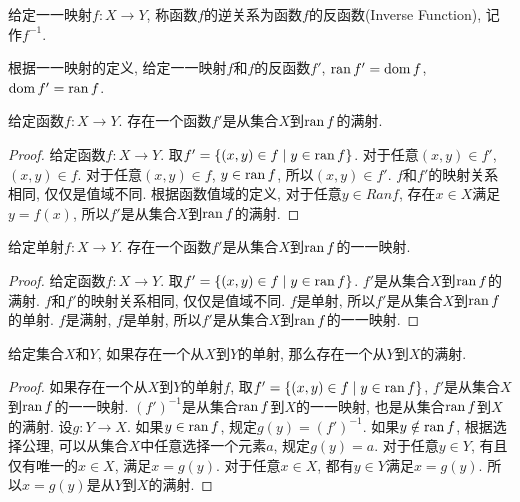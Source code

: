 \begin{definition}
	给定一一映射$f\colon X\rightarrow Y$, 称函数$f$的逆关系为函数$f$的反函数(Inverse Function), 记作$f^{-1}$. 
\end{definition}

根据一一映射的定义, 给定一一映射$f$和$f$的反函数$f'$, $\operatorname{ran} f'=\operatorname{dom} f$, $\operatorname{dom} f'=\operatorname{ran} f$.

\begin{proposition}
	给定函数$f\colon X\rightarrow Y$. 存在一个函数$f'$是从集合$X$到$\operatorname{ran} f$的满射.
\end{proposition}

\begin{proof}
	给定函数$f\colon X\rightarrow Y$. 取$f'=\{(x,y)\in f\mid y\in \operatorname{ran} f\}$. 对于任意$(x,y)\in f'$, $(x,y)\in f$. 对于任意$(x,y)\in f$, $y\in \operatorname{ran} f$, 所以$(x,y)\in f'$. $f$和$f'$的映射关系相同, 仅仅是值域不同. 根据函数值域的定义, 对于任意$y\in Ran f$, 存在$x\in X$满足$y=f(x)$, 所以$f'$是从集合$X$到$\operatorname{ran} f$的满射.
\end{proof}

\begin{proposition}
	给定单射$f\colon X\rightarrow Y$. 存在一个函数$f'$是从集合$X$到$\operatorname{ran} f$的一一映射.
\end{proposition}

\begin{proof}
	给定函数$f\colon X\rightarrow Y$. 取$f'=\{(x,y)\in f\mid y\in \operatorname{ran} f\}$. $f'$是从集合$X$到$\operatorname{ran} f$的满射. $f$和$f'$的映射关系相同, 仅仅是值域不同. $f$是单射, 所以$f'$是从集合$X$到$\operatorname{ran} f$的单射.  $f$是满射, $f$是单射, 所以$f'$是从集合$X$到$\operatorname{ran} f$的一一映射.
\end{proof}

\begin{proposition}
	给定集合$X$和$Y$, 如果存在一个从$X$到$Y$的单射, 那么存在一个从$Y$到$X$的满射.
\end{proposition}

\begin{proof}
	如果存在一个从$X$到$Y$的单射$f$, 取$f'=\{(x,y)\in f\mid y\in \operatorname{ran} f\}$, $f'$是从集合$X$到$\operatorname{ran} f$的一一映射. $(f')^{-1}$是从集合$\operatorname{ran} f$到$X$的一一映射, 也是从集合$\operatorname{ran} f$到$X$的满射. 设$g\colon Y\rightarrow X$. 如果$y \in \operatorname{ran} f$, 规定$g(y)=(f')^{-1}$. 如果$y\notin \operatorname{ran} f$, 根据选择公理, 可以从集合$X$中任意选择一个元素$a$, 规定$g(y)=a$. 对于任意$y\in Y$, 有且仅有唯一的$x\in X$, 满足$x=g(y)$. 对于任意$x\in X$, 都有$y\in Y$满足$x=g(y)$. 所以$x=g(y)$是从$Y$到$X$的满射. 
\end{proof}

